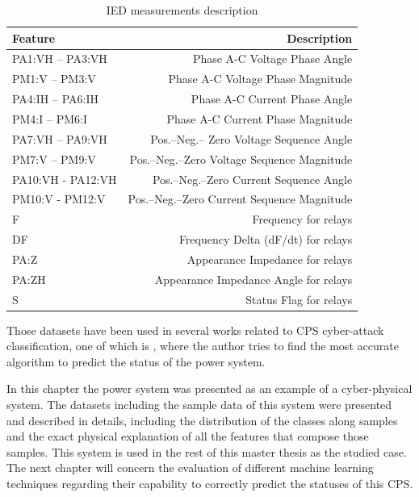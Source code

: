\begin{table}[H]
    \centering
    \caption[IED measurements]{IED measurements description \cite{adhikari_power_2014}} \label{tab:pmu_mes}
    \begin{tabular}{lr}
        \toprule
        Feature&Description \\
        \midrule
        PA1:VH – PA3:VH&Phase A-C Voltage Phase Angle \\
        PM1:V – PM3:V&Phase A-C Voltage Phase Magnitude \\
        PA4:IH – PA6:IH&Phase A-C Current Phase Angle \\
        PM4:I – PM6:I&Phase A-C Current Phase Magnitude \\
        PA7:VH – PA9:VH&Pos.–Neg.– Zero Voltage Sequence Angle \\
        PM7:V – PM9:V&Pos.–Neg.–Zero Voltage Sequence Magnitude \\
        PA10:VH - PA12:VH&Pos.–Neg.–Zero Current Sequence Angle \\
        PM10:V - PM12:V&Pos.–Neg.–Zero Current Sequence Magnitude \\
        F&Frequency for relays \\
        DF&Frequency Delta (dF/dt) for relays \\
        PA:Z&Appearance Impedance for relays \\
        PA:ZH&Appearance Impedance Angle for relays \\
        S&Status Flag for relays \\
        \bottomrule
    \end{tabular}
\end{table} 

Those datasets have been used in several works related to CPS cyber-attack classification, one of which is \cite{borges_hink_machine_2014-1}, where the author tries to find the most accurate algorithm to predict the status of the power system. 

\newpage

In this chapter the power system was presented as an example of a cyber-physical system. The datasets including the sample data of this system were presented and described in details, including the distribution of the classes along samples and the exact physical explanation of all the features that compose those samples. This system is used in the rest of this master thesis as the studied case. The next chapter will concern the evaluation of different machine learning techniques regarding their capability to correctly predict the statuses of this CPS.


